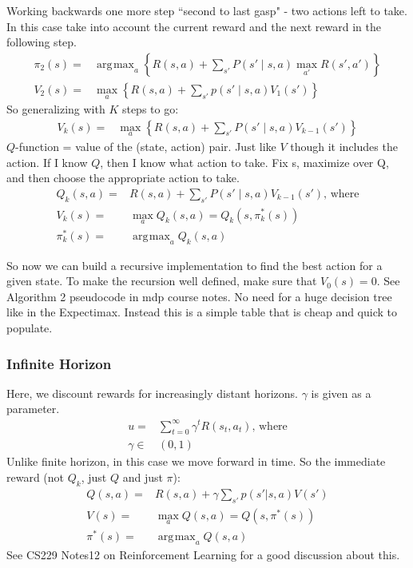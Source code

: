 \documentclass[11pt, oneside]{article}   	%
\DeclareMathOperator*{\argmax}{\arg\!\max}
\begin{document}
Working backwards one more step ``second to last gasp" - two actions left to take. In this case take into account the current reward and the next reward in the following step. 
\begin{align}
\pi_2(s) = & \argmax_a \left\{ R(s,a) + \sum_{s'} P(s'\mid s,a) \max_{a'} R(s',a') \right\}\\
V_2(s) = & \max_a \left\{ R(s,a) + \sum_{s'}p(s'\mid s,a) V_1(s')  \right\}
\end{align}
So generalizing with $K$ steps to go:
\begin{align}
V_k(s) =  &\max_a \left\{ R(s,a) + \sum_{s'} P(s'\mid s,a)V_{k-1}(s')  \right\}
\end{align}
$Q$-function = value of the (state, action) pair. Just like $V$ though it includes the action. If I know $Q$, then I know what action to take. Fix s, maximize over Q, and then choose the appropriate action to take.
\begin{align}
Q_k(s,a) = &R(s,a) + \sum_{s'} P(s'\mid s,a) V_{k-1}(s') \text{, where}\\
V_k(s) = & \max_a Q_k(s,a) = Q_k(s,\pi_k^*(s))\\
\pi_k^*(s) = & \argmax_a Q_k(s,a)
\end{align}

So now we can build a recursive implementation to find the best action for a given state. To make the recursion well defined, make sure that $V_0(s) = 0$. See Algorithm 2 pseudocode in mdp course notes. No need for a huge decision tree like in the Expectimax. Instead this is a simple table that is cheap and quick to populate.

\subsubsection{Infinite Horizon}

Here, we discount rewards for increasingly distant horizons. $\gamma$ is given as a parameter.
\begin{align}
u = & \sum_{t=0}^\infty\gamma^t R(s_t,a_t)\text{, where}\\
\gamma \in & (0,1)
\end{align}
Unlike finite horizon, in this case we move forward in time.
So the immediate reward (not $Q_k$, just $Q$ and just $\pi$):
\begin{align}
Q(s,a) = & R(s,a) + \gamma \sum_{s'} p(s' | s,a)V(s')\\
V(s) = & \max_a Q(s,a) = Q(s,\pi^*(s))\\
\pi^*(s) = &\argmax_a Q(s,a)
\end{align}
See CS229 Notes12 on Reinforcement Learning for a good discussion about this.
\end{document}
